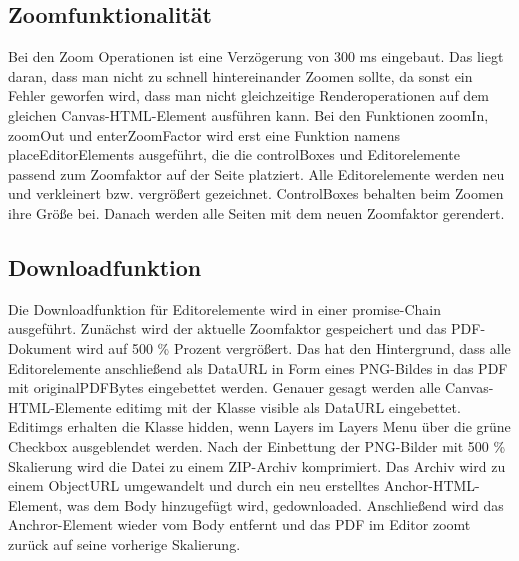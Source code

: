 \subsection{Zoomfunktionalität}
Bei den Zoom Operationen ist eine Verzögerung von 300 ms eingebaut. Das liegt daran, dass man nicht zu schnell hintereinander Zoomen sollte, da sonst ein Fehler geworfen wird, dass man nicht gleichzeitige Renderoperationen auf dem gleichen Canvas-HTML-Element ausführen kann. Bei den Funktionen zoomIn, zoomOut und enterZoomFactor wird erst eine Funktion namens placeEditorElements ausgeführt, die die controlBoxes und Editorelemente passend zum Zoomfaktor auf der Seite platziert. Alle Editorelemente werden neu und verkleinert bzw. vergrößert gezeichnet. ControlBoxes behalten beim Zoomen ihre Größe bei. Danach werden alle Seiten mit dem neuen Zoomfaktor gerendert.

\subsection{Downloadfunktion}
Die Downloadfunktion für Editorelemente wird in einer promise-Chain ausgeführt. Zunächst wird der aktuelle Zoomfaktor gespeichert und das PDF-Dokument wird auf 500 \% Prozent vergrößert. Das hat den Hintergrund, dass alle Editorelemente anschließend als DataURL in Form eines PNG-Bildes in das PDF mit originalPDFBytes eingebettet werden. Genauer gesagt werden alle Canvas-HTML-Elemente editimg mit der Klasse visible als DataURL eingebettet. Editimgs erhalten die Klasse hidden, wenn Layers im Layers Menu über die grüne Checkbox ausgeblendet werden. Nach der Einbettung der PNG-Bilder mit 500 \% Skalierung wird die Datei zu einem ZIP-Archiv komprimiert. Das Archiv wird zu einem ObjectURL umgewandelt und durch ein neu erstelltes Anchor-HTML-Element, was dem Body hinzugefügt wird, gedownloaded. Anschließend wird das Anchror-Element wieder vom Body entfernt und das PDF im Editor zoomt zurück auf seine vorherige Skalierung.














